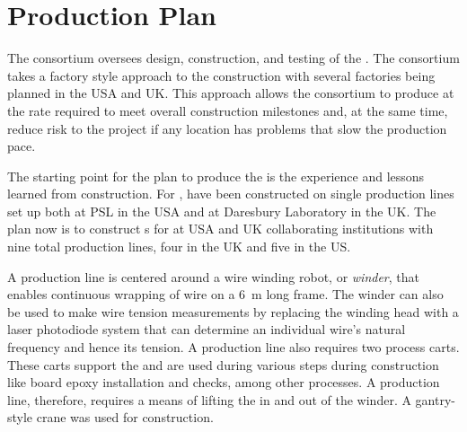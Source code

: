 \section{Production Plan}
\label{sec:fdsp-apa-prod}

The  consortium oversees design, construction, and testing of the   .  The  consortium takes a factory style approach to the construction with several factories being planned in the USA and UK. This approach allows the consortium to produce  at the rate required to meet overall construction milestones and, at the same time, reduce risk to the project if any location has problems that slow the production pace.

The starting point for the  plan to produce the  is the experience and lessons learned from  construction. For ,  have been constructed on single production lines set up both at PSL in the USA and at Daresbury Laboratory in the UK.  The plan now is to construct s for  at USA and UK collaborating institutions with nine total production lines, four in the UK and five in the US.  %

A production line is centered around a wire winding robot, or \textit{winder}, that enables continuous wrapping of wire on a \SI{6}{m} long frame. The winder can also be used to make wire tension measurements by replacing the winding head with a laser photodiode system that can determine an individual wire's natural frequency and hence its tension. A production line also requires two process carts. These carts support the  and are used during various steps during construction like board epoxy installation and  checks, among other processes. A production line, therefore, requires a means of lifting the  in and out of the winder. A gantry-style crane was used for  construction.

